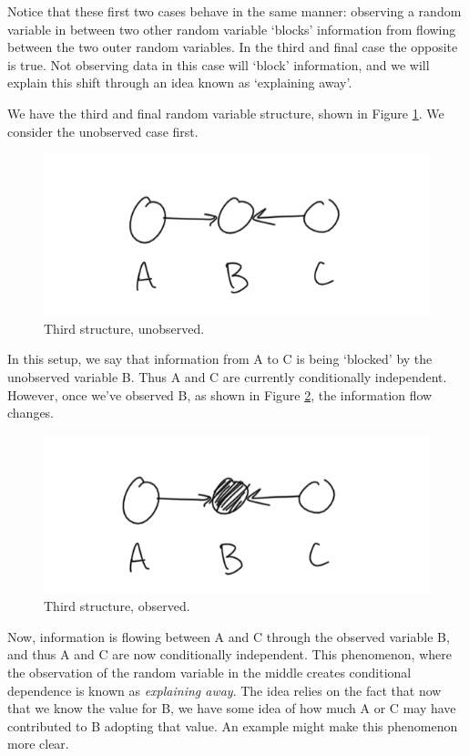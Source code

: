 Notice that these first two cases behave in the same manner: observing a random variable in between two other random variable `blocks' information from flowing between the two outer random variables. In the third and final case the opposite is true. Not observing data in this case will `block' information, and we will explain this shift through an idea known as `explaining away'.

We have the third and final random variable structure, shown in Figure \ref{fig:third-case-unobserved}. We consider the unobserved case first.
\begin{figure}
	\centering
	\includegraphics[width=0.5\paperwidth]{../GraphicalModels/fig/third-case-unobserved.png}
	\caption{Third structure, unobserved.}
	\label{fig:third-case-unobserved}
\end{figure}

In this setup, we say that information from A to C is being `blocked' by the unobserved variable B. Thus A and C are currently conditionally independent. However, once we've observed B, as shown in Figure \ref{fig:third-case-observed}, the information flow changes.
\begin{figure}
	\centering
	\includegraphics[width=0.5\paperwidth]{../GraphicalModels/fig/third-case-observed.png}
	\caption{Third structure, observed.}
	\label{fig:third-case-observed}
\end{figure}

Now, information is flowing between A and C through the observed variable B, and thus A and C are now conditionally independent. This phenomenon, where the observation of the random variable in the middle creates conditional dependence is known as \textit{explaining away}. The idea relies on the fact that now that we know the value for B, we have some idea of how much A or C may have contributed to B adopting that value. An example might make this phenomenon more clear.


